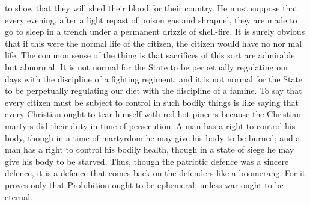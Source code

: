 \documentclass{book}
\begin{document}
to show that they will shed their blood for their country. He must suppose that every evening, after a light repast of poison gas and shrapnel, they are made to go to sleep in a trench under a permanent drizzle of shell-fire. It is surely obvious that if this were the normal life of the citizen, the citizen would have no nor mal life. The common sense of the thing is that sacrifices of this sort are admirable but abnormal. It is not normal for the State to be perpetually regulating our days with the discipline of a fighting regiment; and it is not normal for the State to be perpetually regulating our diet with the discipline of a famine. To say that every citizen must be subject to control in such bodily things is like saying that every Christian ought to tear himself with red-hot pincers because the Christian martyrs did their duty in time of persecution. A man has a right to control his body, though in a time of martyrdom he may give his body to be burned; and a man has a right to control his bodily health, though in a state of siege he may give his body to be starved. Thus, though the patriotic defence was a sincere defence, it is a defence that comes back on the defenders like a boomerang. For it proves only that Prohibition ought to be ephemeral, unless war ought to be eternal.
\end{document}
